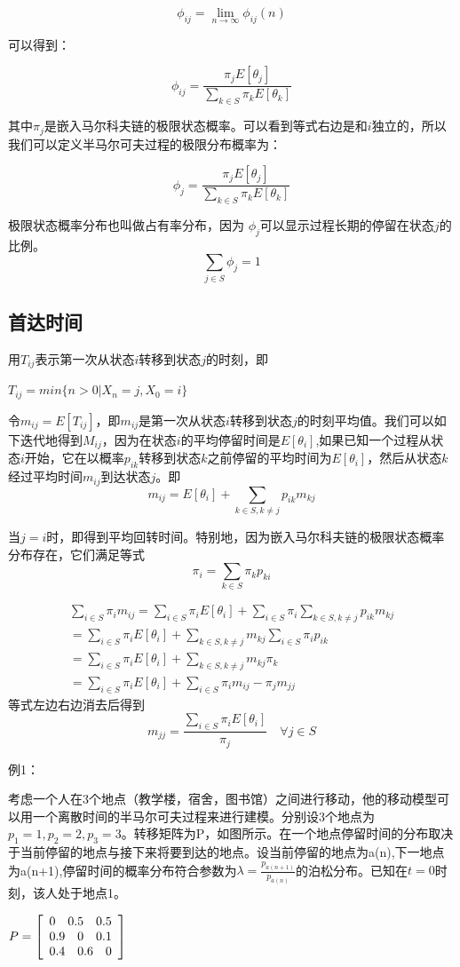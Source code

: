 \documentclass[UTF8]{ctexart}
\begin{document}
$$\phi_{ij}=\lim_{n\to \infty} \phi_{ij}(n) $$

可以得到：

$$\phi_{ij}=\frac{\pi_jE[\theta_j]}{\sum_{k\in S} \pi_kE[\theta_k]}$$

其中$\pi_j$是嵌入马尔科夫链的极限状态概率。可以看到等式右边是和$i$独立的，所以我们可以定义半马尔可夫过程的极限分布概率为：

$$\phi_j=\frac{\pi_jE[\theta_j]}{\sum_{k \in S} \pi_kE[\theta_k]}$$

极限状态概率分布也叫做占有率分布，因为 $\phi_j$可以显示过程长期的停留在状态$j$的比例。
$$\sum_{j\in S} \phi_j=1$$

\subsection{首达时间}
用$T_{ij}$表示第一次从状态$i$转移到状态$j$的时刻，即
\begin{center}
$T_{ij}=min\{n>0|X_n=j,X_0=i\}$
\end{center}
令$m_{ij}=E[T_{ij}]$，即$m_{ij}$是第一次从状态$i$转移到状态$j$的时刻平均值。我们可以如下迭代地得到$M_{ij}$，因为在状态$i$的平均停留时间是$E[\theta_i]$,如果已知一个过程从状态$i$开始，它在以概率$p_{ik}$转移到状态$k$之前停留的平均时间为$E[\theta_i]$，然后从状态$k$经过平均时间$m_{ij}$到达状态$j$。即
$$m_{ij}=E[\theta_i]+\sum_{k\in S,k\ne j} p_{ik}m_{kj} $$

当$j=i$时，即得到平均回转时间。特别地，因为嵌入马尔科夫链的极限状态概率分布存在，它们满足等式
$$\pi_i=\sum_{k\in S} \pi_kp_{ki}$$

$$
\begin{aligned}
\sum_{i \in S}\pi_im_{ij}=\sum_{i \in S}\pi_iE[\theta_i]+\sum_{i\in S}\pi_i\sum_{k\in S,k\ne j}p_{ik}m_{kj}  
\\= \sum_{i \in S}\pi_iE[\theta_i]+\sum_{k\in S,k\ne j}m_{kj}\sum_{i \in S}\pi_ip_{ik} 
\\ = \sum_{i \in S}\pi_iE[\theta_i]+\sum_{k \in S,k\ne j}m_{kj}\pi_k 
\\= \sum_{i \in S}\pi_iE[\theta_i]+\sum_{i\in S}\pi_im_{ij}-\pi_jm_{jj}
\end{aligned}
$$
等式左边右边消去后得到
$$m_{jj}=\frac{\sum_{i\in S}\pi_iE[\theta_i]}{\pi_j}\quad \forall j \in S$$

例1：

考虑一个人在3个地点（教学楼，宿舍，图书馆）之间进行移动，他的移动模型可以用一个离散时间的半马尔可夫过程来进行建模。分别设3个地点为$p_1=1,p_2=2,p_3=3$。转移矩阵为P，如图所示。在一个地点停留时间的分布取决于当前停留的地点与接下来将要到达的地点。设当前停留的地点为a(n),下一地点为a(n+1),停留时间的概率分布符合参数为$\lambda=\frac{p_{a(n+1)}}{p_{a(n)}}$的泊松分布。已知在$t=0$时刻，该人处于地点1。
\begin{center}
$P=
\left[
\begin{array}{c c c}
0 \quad 0.5 \quad 0.5\\
0.9 \quad  0 \quad  0.1\\
0.4 \quad  0.6 \quad  0
\end{array}
\right]$
\end{center}
\end{document}
